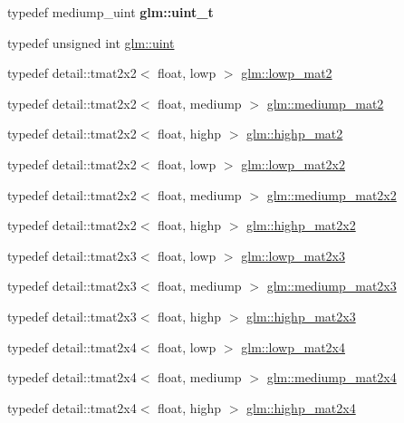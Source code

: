 \begin{DoxyCompactItemize}
\item 
typedef mediump\+\_\+uint {\bfseries glm\+::uint\+\_\+t}\hypertarget{group__core__precision_ga5f2ae871c284c9d39ae8fdbb1305b566}{}\label{group__core__precision_ga5f2ae871c284c9d39ae8fdbb1305b566}

\item 
typedef unsigned int \hyperlink{group__core__precision_ga4fd29415871152bfb5abd588334147c8}{glm\+::uint}
\item 
typedef detail\+::tmat2x2$<$ float, lowp $>$ \hyperlink{group__core__precision_gac0acc3ccf8da050af3393ea639f698d6}{glm\+::lowp\+\_\+mat2}
\item 
typedef detail\+::tmat2x2$<$ float, mediump $>$ \hyperlink{group__core__precision_ga6ed8bfa67b72cea216cb558411f95f86}{glm\+::mediump\+\_\+mat2}
\item 
typedef detail\+::tmat2x2$<$ float, highp $>$ \hyperlink{group__core__precision_gab9884251d84b95dbbf27aa1e4b3a1ec7}{glm\+::highp\+\_\+mat2}
\item 
typedef detail\+::tmat2x2$<$ float, lowp $>$ \hyperlink{group__core__precision_ga7d7e123d953978cc17de6882bb10400e}{glm\+::lowp\+\_\+mat2x2}
\item 
typedef detail\+::tmat2x2$<$ float, mediump $>$ \hyperlink{group__core__precision_ga867b486aea2d228a1e1a134af73b2c4b}{glm\+::mediump\+\_\+mat2x2}
\item 
typedef detail\+::tmat2x2$<$ float, highp $>$ \hyperlink{group__core__precision_ga694146b8d430b22caa8b37571d9bc8bc}{glm\+::highp\+\_\+mat2x2}
\item 
typedef detail\+::tmat2x3$<$ float, lowp $>$ \hyperlink{group__core__precision_gaef481e637af5103a83ab561d30d28f2a}{glm\+::lowp\+\_\+mat2x3}
\item 
typedef detail\+::tmat2x3$<$ float, mediump $>$ \hyperlink{group__core__precision_gad4e099c0dfa8f35ce9c0ddc8605428cf}{glm\+::mediump\+\_\+mat2x3}
\item 
typedef detail\+::tmat2x3$<$ float, highp $>$ \hyperlink{group__core__precision_ga7d4e5a1c803be5688c75241c924dfa58}{glm\+::highp\+\_\+mat2x3}
\item 
typedef detail\+::tmat2x4$<$ float, lowp $>$ \hyperlink{group__core__precision_gaa62e33ee2864909c8522a549fbf40ce5}{glm\+::lowp\+\_\+mat2x4}
\item 
typedef detail\+::tmat2x4$<$ float, mediump $>$ \hyperlink{group__core__precision_gae90cf4be1ded03a3a5b7b42045da253c}{glm\+::mediump\+\_\+mat2x4}
\item 
typedef detail\+::tmat2x4$<$ float, highp $>$ \hyperlink{group__core__precision_ga3cc506666b7a95db56f9d2eb787b6e20}{glm\+::highp\+\_\+mat2x4}

\end{DoxyCompactItemize}
